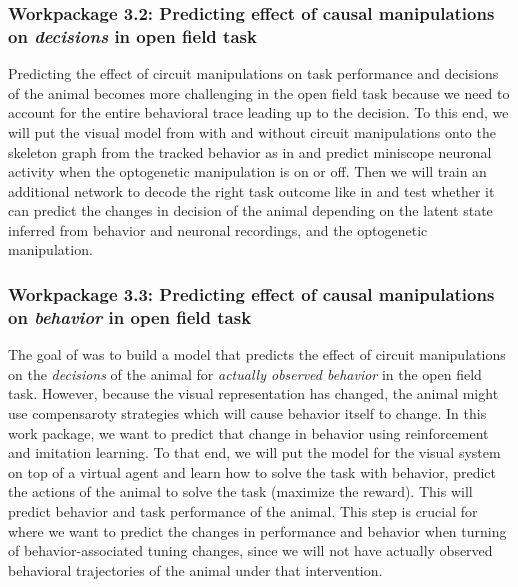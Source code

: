 \documentclass[B2,COG]{ercgrant}
\begin{document}
\subsubsection{Workpackage 3.2: Predicting effect of causal manipulations on \textit{decisions} in open field task\hfill{}}
Predicting the effect of circuit manipulations on task performance and decisions of the animal becomes more challenging in the open field task because we need to account for the entire behavioral trace leading up to the decision. 
To this end, we will put the visual model from  with and without circuit manipulations onto the skeleton graph from the tracked behavior as in  and predict miniscope neuronal activity when the optogenetic manipulation is on or off. 
Then we will train an additional network to decode the right task outcome like in  and test whether it can predict the changes in decision of the animal depending on the latent state inferred from behavior and neuronal recordings, and the optogenetic manipulation. 

\subsubsection{Workpackage 3.3: Predicting effect of causal manipulations on \textit{behavior} in open field task\hfill{}}
The goal of  was to build a model that predicts the effect of circuit manipulations on the \textit{decisions} of the animal for \textit{actually observed behavior} in the open field task. 
However, because the visual representation has changed, the animal might use compensaroty strategies which will cause behavior itself to change. 
In this work package, we want to predict that change in behavior using reinforcement and imitation learning. 
To that end, we will put the model for the visual system on top of a virtual agent and learn how to solve the task with behavior, \ie predict the actions of the animal to solve the task (maximize the reward). 
This will predict behavior and task performance of the animal. 
This step is crucial for  where we want to predict the changes in performance and behavior when turning of behavior-associated tuning changes, since we will not have actually observed behavioral trajectories of the animal under that intervention. 
\end{document}
